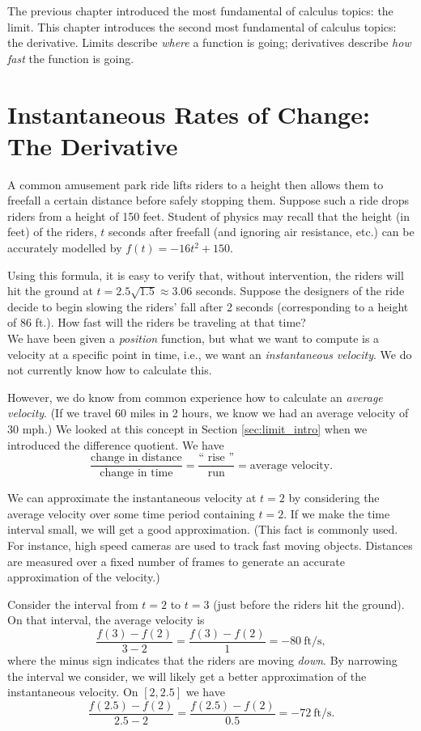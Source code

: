 The previous chapter introduced the most fundamental of calculus topics: the limit. This chapter introduces the second most fundamental of calculus topics: the derivative. Limits describe \textit{where} a function is going; derivatives describe \textit{how fast} the function is going.

\section{Instantaneous Rates of Change: The Derivative}\label{sec:derivative}

A common amusement park ride lifts riders to a height then allows them to freefall a certain distance before safely stopping them. Suppose such a ride drops riders from a height of 150 feet. Student of physics may recall that the height (in feet) of the riders, $t$ seconds after freefall (and ignoring air resistance, etc.) can be accurately modelled by $f(t) = -16t^2+150$. 

Using this formula, it is easy to verify that, without intervention, the riders will hit the ground at $t=2.5\sqrt{1.5} \approx 3.06$ seconds. Suppose the designers of the ride decide to begin slowing the riders' fall after 2 seconds (corresponding to a height of 86 ft.). How fast will the riders be traveling at that time?\\

We have been given a \textit{position} function, but what we want to compute is a velocity at a specific point in time, i.e., we want an \textit{instantaneous velocity}. We do not currently know how to calculate this.

However, we do know from common experience how to calculate an \textit{average velocity}. (If we travel 60 miles in 2 hours, we know we had an average velocity of 30 mph.) We looked at this concept in Section \ref{sec:limit_intro} when we introduced the difference quotient. We have 
	$$\frac{\text{change in distance}}{\text{change in time}} = \frac{\text{``\ rise\ ''}}{\text{run}} = \text{average velocity}.$$
	
We can approximate the instantaneous velocity at $t=2$ by considering the average velocity over some time period containing $t=2$. If we make the time interval small, we will get a good approximation. (This fact is commonly used. For instance, high speed cameras are used to track fast moving objects. Distances are measured over a fixed number of frames to generate an accurate approximation of the velocity.)

Consider the interval from $t=2$ to $t=3$ (just before the riders hit the ground). On that interval, the average velocity is 
		$$\frac{f(3)-f(2)}{3-2} = \frac{f(3)-f(2)}{1} =-80\ \text{ft/s},$$
where the minus sign indicates that the riders are moving \textit{down}. By narrowing the interval we consider, we will likely get a better approximation of the instantaneous velocity. On $[2,2.5]$ we have 
	$$\frac{f(2.5)-f(2)}{2.5-2} = \frac{f(2.5)-f(2)}{0.5} =-72\ \text{ft/s}.$$

